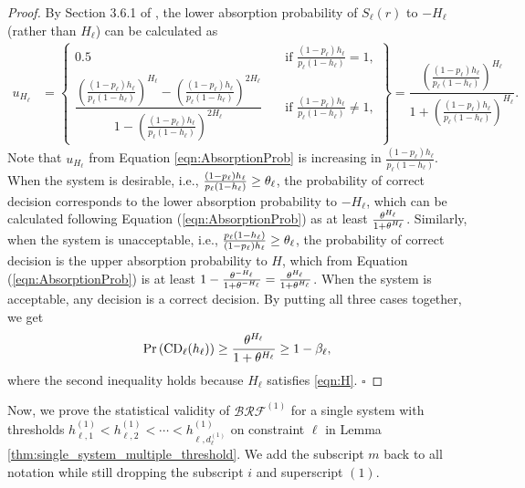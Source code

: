 \documentclass[11pt]{article}
\begin{document}
\begin{proof}
By Section 3.6.1 of \citet{TaylorKarlin1994}, the lower absorption probability of $S_\ell(r)$ to $-H_\ell$ (rather than $H_\ell$) can be calculated as  
\begin{align}
u_{H_\ell}
&=
\left\{
\begin{array}{ll}
0.5 
& \quad \text{if } \frac{(1-p_\ell)h_\ell}{p_\ell (1-h_\ell)} = 1, \\[6pt]
\dfrac{\left(\frac{(1-p_\ell)h_\ell}{p_\ell (1-h_\ell)}\right)^{H_\ell}- \left(  \frac{(1-p_\ell) h_\ell}{p_\ell (1-h_\ell)}\right)^{2 H_\ell} }{1 - \left( \frac{(1-p_\ell)h_\ell}{p_\ell (1-h_\ell)} \right)^{2H_\ell}} 
& \quad \text{if }  \frac{(1-p_\ell) h_\ell}{p_\ell (1-h_\ell)} \ne 1,
\end{array}
\right\}
=
\dfrac{\left(  \frac{(1-p_\ell) h_\ell}{p_\ell (1-h_\ell)}\right)^{H_\ell}}{1+\left(  \frac{(1-p_\ell) h_\ell}{p_\ell (1-h_\ell)}\right)^{H_\ell}}.
\label{eqn:AbsorptionProb}
\end{align}
Note that $u_{H_\ell}$ from Equation \eqref{eqn:AbsorptionProb} is increasing in $\frac{(1-p_\ell)h_\ell}{p_\ell(1-h_\ell)}$.
When the system is desirable, i.e., $
{(1-p_\ell) h_\ell \over p_\ell (1-h_\ell)} \ge \theta_\ell$, the probability of correct decision corresponds to the lower absorption probability to $-H_\ell$, which can be calculated following Equation (\ref{eqn:AbsorptionProb}) as at least
${\theta^{H_\ell} \over 1 + \theta^{H_\ell}}$.  
Similarly, when the system is unacceptable, i.e., $
{p_\ell (1-h_\ell) \over (1-p_\ell)h_\ell} \ge \theta_\ell$, 
the probability of correct decision is the upper absorption probability to $H$, which from Equation (\ref{eqn:AbsorptionProb}) is at least $1-\frac{\theta^{-H_\ell}}{1+\theta^{-H_\ell}}={\theta^{H_\ell} \over 1 + \theta^{H_\ell}}$.
When the system is acceptable, any decision is a correct decision. By putting all three cases together, we get 
\[
\Pr\left( {\rm CD}_\ell(h_\ell) \right)  \ge {\theta^{H_\ell} \over 1 + \theta^{H_\ell}} \ge 1 - \beta_\ell, %
\]
where the second inequality holds because $H_\ell$ satisfies \eqref{eqn:H}. 
\hspace{6cm} $\square$
\end{proof}
\vspace{-0.5cm}

Now, we prove the statistical validity of $\mathcal{BRF}^{(1)}$ for a single system with thresholds $h_{\ell,1}^{(1)} < h_{\ell,2}^{(1)} < \cdots < h_{\ell, d_\ell^{(1)}}^{(1)}$ on constraint $\ell$ in Lemma \ref{thm:single_system_multiple_threshold}. We add the subscript $m$ back to all notation while still dropping the subscript $i$ and superscript $(1)$. 
\end{document}
